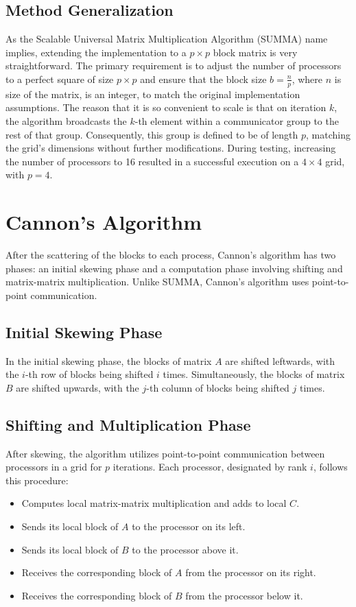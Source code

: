 \documentclass{article}
\begin{document}
\subsection{Method Generalization}
As the Scalable Universal Matrix Multiplication Algorithm (SUMMA) name implies, extending the implementation to a \( p \times p \) block matrix is very straightforward. The primary requirement is to adjust the number of processors to a perfect square of size \( p \times p \) and ensure that the block size \( b = \frac{n}{p} \), where \( n\) is size of the matrix, is an integer, to match the original implementation assumptions. The reason that it is so convenient to scale is that on iteration \( k \), the algorithm broadcasts the \( k \)-th element within a communicator group to the rest of that group. Consequently, this group is defined to be of length \( p \), matching the grid's dimensions without further modifications. During testing, increasing the number of processors to 16 resulted in a successful execution on a \( 4 \times 4 \) grid, with \( p = 4 \).

\section{Cannon's Algorithm}
After the scattering of the blocks to each process, Cannon's algorithm has two phases: an initial skewing phase and a computation phase involving shifting and matrix-matrix multiplication. Unlike SUMMA, Cannon's algorithm uses point-to-point communication.

\subsection{Initial Skewing Phase}
In the initial skewing phase, the blocks of matrix \( A \) are shifted leftwards, with the \(i\)-th row of blocks being shifted \(i\) times. Simultaneously, the blocks of matrix \( B \) are shifted upwards, with the \(j\)-th column of blocks being shifted \(j\) times.

\subsection{Shifting and Multiplication Phase}
After skewing, the algorithm utilizes point-to-point communication between processors in a grid for \( p \) iterations. Each processor, designated by rank \(i\), follows this procedure:
\begin{itemize}
    \item Computes local matrix-matrix multiplication and adds to local \( C\).
    \item Sends its local block of \( A \) to the processor on its left.
    \item Sends its local block of \( B \) to the processor above it.
    \item Receives the corresponding block of \( A \) from the processor on its right.
    \item Receives the corresponding block of \( B \) from the processor below it.
\end{itemize}
\end{document}
